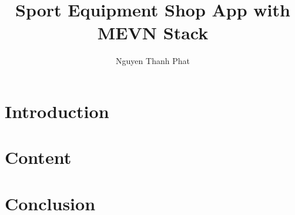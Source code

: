 \documentclass[a4paper,12pt,oneside]{report}
\title{Sport Equipment Shop App with MEVN Stack}
\author{Nguyen Thanh Phat}
\begin{document}



\tableofcontents
\listoffigures
\listoftables







\clearpage
\renewcommand\thesection{\arabic{section}}
\part{Introduction}


\part{Content}


\part{Conclusion}



{}

\end{document}
